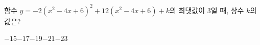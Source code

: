함수 $y=-2(x^2-4x+6)^2+12(x^2-4x+6)+k$의 최댓값이 $3$일 때, 상수 $k$의 값은?
\begin{choices32}{$-15$}{$-17$}{$-19$}{$-21$}{$-23$}\end{choices32}
